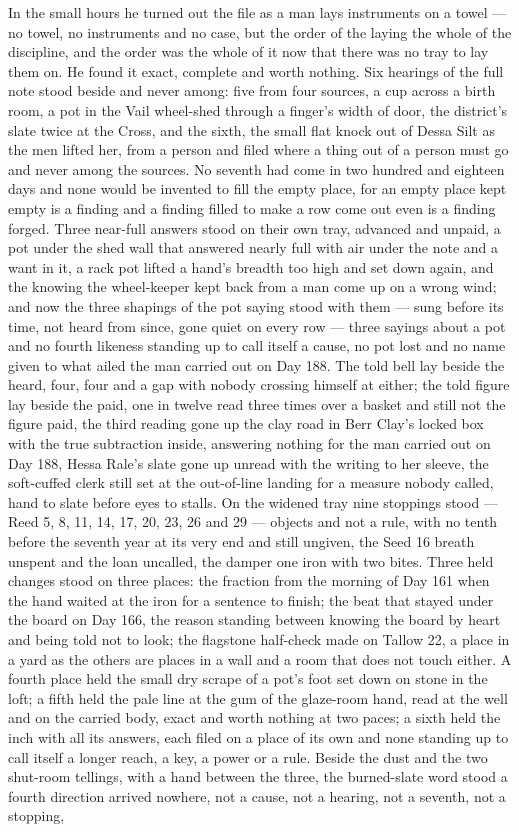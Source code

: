 In the small hours he turned out the file as a man lays instruments on a towel --- no towel, no instruments and no case, but the order of the laying the whole of the discipline, and the order was the whole of it now that there was no tray to lay them on. He found it exact, complete and worth nothing. Six hearings of the full note stood beside and never among: five from four sources, a cup across a birth room, a pot in the Vail wheel-shed through a finger's width of door, the district's slate twice at the Cross, and the sixth, the small flat knock out of Dessa Silt as the men lifted her, from a person and filed where a thing out of a person must go and never among the sources. No seventh had come in two hundred and eighteen days and none would be invented to fill the empty place, for an empty place kept empty is a finding and a finding filled to make a row come out even is a finding forged. Three near-full answers stood on their own tray, advanced and unpaid, a pot under the shed wall that answered nearly full with air under the note and a want in it, a rack pot lifted a hand's breadth too high and set down again, and the knowing the wheel-keeper kept back from a man come up on a wrong wind; and now the three shapings of the pot saying stood with them --- sung before its time, not heard from since, gone quiet on every row --- three sayings about a pot and no fourth likeness standing up to call itself a cause, no pot lost and no name given to what ailed the man carried out on Day 188. The told bell lay beside the heard, four, four and a gap with nobody crossing himself at either; the told figure lay beside the paid, one in twelve read three times over a basket and still not the figure paid, the third reading gone up the clay road in Berr Clay's locked box with the true subtraction inside, answering nothing for the man carried out on Day 188, Hessa Rale's slate gone up unread with the writing to her sleeve, the soft-cuffed clerk still set at the out-of-line landing for a measure nobody called, hand to slate before eyes to stalls. On the widened tray nine stoppings stood --- Reed 5, 8, 11, 14, 17, 20, 23, 26 and 29 --- objects and not a rule, with no tenth before the seventh year at its very end and still ungiven, the Seed 16 breath unspent and the loan uncalled, the damper one iron with two bites. Three held changes stood on three places: the fraction from the morning of Day 161 when the hand waited at the iron for a sentence to finish; the beat that stayed under the board on Day 166, the reason standing between knowing the board by heart and being told not to look; the flagstone half-check made on Tallow 22, a place in a yard as the others are places in a wall and a room that does not touch either. A fourth place held the small dry scrape of a pot's foot set down on stone in the loft; a fifth held the pale line at the gum of the glaze-room hand, read at the well and on the carried body, exact and worth nothing at two paces; a sixth held the inch with all its answers, each filed on a place of its own and none standing up to call itself a longer reach, a key, a power or a rule. Beside the dust and the two shut-room tellings, with a hand between the three, the burned-slate word stood a fourth direction arrived nowhere, not a cause, not a hearing, not a seventh, not a stopping, 